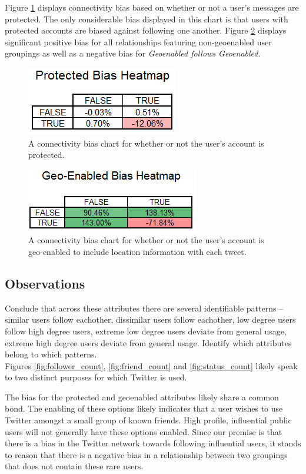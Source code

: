 Figure \ref{fig:protected} displays connectivity bias based on whether or not a user's messages are protected.  The only considerable bias displayed in this chart is that users with protected accounts are biased against following one another.  Figure \ref{fig:geoenabled} displays significant positive bias for all relationships featuring non-geoenabled user groupings as well as a negative bias for \textit{Geoenabled follows Geoenabled}.

\begin{figure}[t]
 \centering
 \includegraphics[bb=0 0 188 86, scale=.5]{./images/protected.png}
 \caption{A connectivity bias chart for whether or not the user's account is protected.}
 \label{fig:protected}
\end{figure}

\begin{figure}[t]
 \centering
 \includegraphics[bb=0 0 214 80, scale=.5]{./images/geoenabled.png}
 \caption{A connectivity bias chart for whether or not the user's account is geo-enabled to include location information with each tweet.}
 \label{fig:geoenabled}
\end{figure}

\subsection{Observations}
Conclude that across these attributes there are several identifiable patterns -- similar users follow eachother, dissimilar users follow eachother, low degree users follow high degree users, extreme low degree users deviate from general usage, extreme high degree users deviate from general usage.  Identify which attributes belong to which patterns.\\

Figures \ref{fig:follower_count}, \ref{fig:friend_count} and \ref{fig:status_count} likely speak to two distinct purposes for which Twitter is used.

The bias for the protected and geoenabled attributes likely share a common bond.  The enabling of these options likely indicates that a user wishes to use Twitter amongst a small group of known friends.  High profile, influential public users will not generally have these options enabled.  Since our premise is that there is a bias in the Twitter network towards following influential users, it stands to reason that there is a negative bias in a relationship between two groupings that does not contain these rare users.
